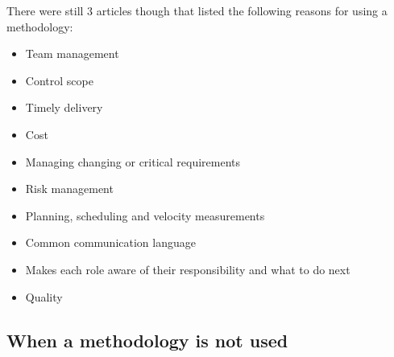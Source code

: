There were still 3 articles though that listed the following reasons for using a methodology:
\begin{itemize}
    \item Team management \cite{lucena_2008}
    \item Control scope \cite{lucena_2008}
    \item Timely delivery \cite{lucena_2008, garg_2015}
    \item Cost \cite{lucena_2008, uzturk_2013, garg_2015}
    \item Managing changing or critical requirements \cite{lucena_2008, uzturk_2013}
    \item Risk management \cite{lucena_2008, uzturk_2013, garg_2015}
    \item Planning, scheduling and velocity measurements \cite{uzturk_2013}
    \item Common communication language \cite{uzturk_2013}
    \item Makes each role aware of their responsibility and what to do next \cite{uzturk_2013}
    \item Quality \cite{garg_2015}
\end{itemize}

\subsection{When a methodology is not used}
